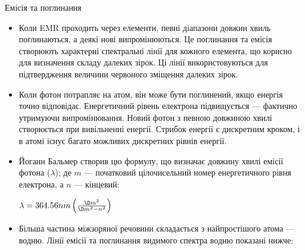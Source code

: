 {\Large Емісія та поглинання}
\begin{itemize}


\item Коли EMR проходить через елементи, певні діапазони довжин хвиль поглинаються, а деякі нові випромінюються. Це поглинання та емісія створюють характерні спектральні лінії для кожного елемента, що корисно для визначення складу далеких зірок. Ці лінії використовуються для підтвердження величини червоного зміщення далеких зірок.

\item
 Коли фотон потрапляє на атом, він може бути поглинений, якщо енергія точно відповідає.
 Енергетичний рівень електрона підвищується --- фактично утримуючи випромінювання.
 Новий фотон з певною довжиною хвилі створюється при вивільненні енергії.
 Стрибок енергії є дискретним кроком, і в атомі існує багато можливих дискретних рівнів енергії.

\item \begin{minipage}[t]{3.5in} Йоганн Бальмер створив цю формулу, що визначає довжину хвилі емісії фотона ($\lambda$); де $m$ --- початковий цілочисельний номер енергетичного рівня електрона, а $n$ --- кінцевий: \end{minipage}%
\hspace{0.2in}
\begin{minipage}[t]{1.5in}\vspace{0.01in}
	$\lambda = 364.56nm \left( \frac{\D m^2}{\D m^2 - n^2} \right)$
\end{minipage}

\vspace{0.02in}

\item Більша частина міжзоряної речовини складається з найпростішого атома --- водню. Лінії емісії та поглинання видимого спектра водню показані нижче:

\end{itemize}



